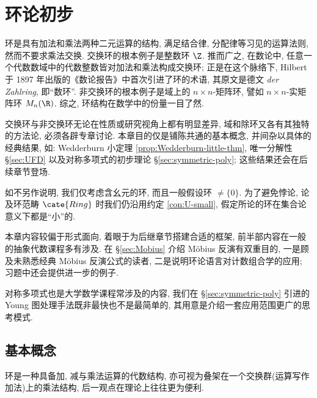 
\chapter{环论初步}\label{sec:ring}
环是具有加法和乘法两种二元运算的结构, 满足结合律, 分配律等习见的运算法则, 然而不要求乘法交换. 交换环的根本例子是整数环 $\Z$. 推而广之, 在数论中, 任意一个代数数域中的代数整数皆对加法和乘法构成交换环; 正是在这个脉络下, Hilbert 于 1897 年出版的《数论报告》中首次引进了环的术语, 其原文是德文 \textit{der Zahlring}, 即``数环''. 非交换环的根本例子是域上的 $n \times n$-矩阵环, 譬如 $n \times n$-实矩阵环 $M_n(\R)$. 综之, 环结构在数学中的份量一目了然.

交换环与非交换环无论在性质或研究视角上都有明显差异, 域和除环又各有其独特的方法论, 必须各辟专章讨论. 本章目的仅是铺陈共通的基本概念, 并间杂以具体的经典结果, 如: Wedderburn 小定理 \ref{prop:Wedderburn-little-thm}, 唯一分解性 \S\ref{sec:UFD} 以及对称多项式的初步理论 \S\ref{sec:symmetric-poly}; 这些结果还会在后续章节登场.

如不另作说明, 我们仅考虑含幺元的环, 而且一般假设环 $\neq \{0\}$. 为了避免悖论, 论及环范畴 $\cate{Ring}$ 时我们仍沿用约定 \ref{con:U-small}, 假定所论的环在集合论意义下都是``小''的.

\begin{wenxintishi}
	本章内容较偏于形式面向, 着眼于为后继章节搭建合适的框架, 前半部内容在一般的抽象代数课程多有涉及. 在 \S\ref{sec:Mobius} 介绍 Möbius 反演有双重目的, 一是顾及未熟悉经典 Möbius 反演公式的读者, 二是说明环论语言对计数组合学的应用; 习题中还会提供进一步的例子.

	对称多项式也是大学数学课程常涉及的内容, 我们在 \S\ref{sec:symmetric-poly} 引进的 Young 图处理手法既非最快也不是最简单的, 其用意是介绍一套应用范围更广的思考模式.
\end{wenxintishi}

\section{基本概念}\label{sec:ring-basics}
环是一种具备加, 减与乘法运算的代数结构, 亦可视为叠架在一个交换群(运算写作加法)上的乘法结构, 后一观点在理论上往往更为便利.

